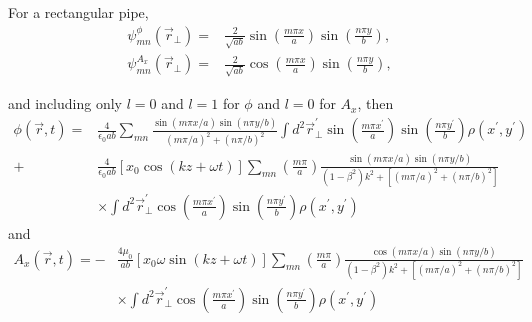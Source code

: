 \documentclass[11pt,oneside]{article}
\begin{document}
For a rectangular pipe,
\begin{equation}
\begin{split}
  \psi_{mn}^{\phi} \left( \vec{r}_{\perp} \right)
= & \frac{2}{\sqrt{ab}} \sin \left( \frac{m \pi x}{a} \right)
                      \sin \left( \frac{n \pi y}{b} \right), \\
  \psi_{mn}^{A_{x}} \left( \vec{r}_{\perp} \right)
= & \frac{2}{\sqrt{ab}} \cos \left( \frac{m \pi x}{a} \right)
                      \sin \left( \frac{n \pi y}{b} \right),
\end{split}
\end{equation}

and including only $l=0$ and $l=1$ for $\phi$ and $l=0$ for $A_{x}$, then
\begin{equation}
\begin{split}
  \phi \left( \vec{r},t \right)
= & \frac{4}{\epsilon_{0} ab}
    \sum_{mn}
    \frac{ \sin \left( m \pi x / a \right) \sin \left( n \pi y / b \right) }
         { \left( m \pi /a \right)^{2} + \left( n \pi / b \right)^{2} }
    \int d^{2} \vec{r}_{\perp}^{\prime}
    \sin \left( \frac{m \pi x^{\prime} }{a} \right)
    \sin \left( \frac{n \pi y^{\prime} }{b} \right) 
    \rho \left( x^{\prime}, y^{\prime} \right) \\
+ & \frac{4}{\epsilon_{0} ab}
    \left[ x_{0} \cos(kz+\omega t) \right]
    \sum_{mn} \left( \frac{m \pi}{a} \right)
    \frac{ \sin \left( m \pi x / a \right) \sin \left( n \pi y / b \right) }
         { \left( 1 - \beta^{2} \right) k^{2}
         + \left[ \left( m \pi /a \right)^{2}
                + \left( n \pi / b \right)^{2} \right] } \\
  & \times
    \int d^{2} \vec{r}_{\perp}^{\prime}
    \cos \left( \frac{m \pi x^{\prime} }{a} \right)
    \sin \left( \frac{n \pi y^{\prime} }{b} \right)
    \rho \left( x^{\prime}, y^{\prime} \right)
\end{split}
\end{equation}
and
\begin{equation}
\begin{split}
  A_{x} \left( \vec{r},t \right) =
- & \frac{4 \mu_{0}}{ab}
    \left[ x_{0} \omega \sin(kz+\omega t) \right]
    \sum_{mn} \left( \frac{m \pi}{a} \right)
    \frac{ \cos \left( m \pi x / a \right) \sin \left( n \pi y / b \right) }
         { \left( 1 - \beta^{2} \right) k^{2}
         + \left[ \left( m \pi /a \right)^{2}
                + \left( n \pi / b \right)^{2} \right] } \\
  & \times
    \int d^{2} \vec{r}_{\perp}^{\prime}
    \cos \left( \frac{m \pi x^{\prime} }{a} \right)
    \sin \left( \frac{n \pi y^{\prime} }{b} \right)
    \rho \left( x^{\prime}, y^{\prime} \right)
\end{split}
\end{equation}
\end{document}
